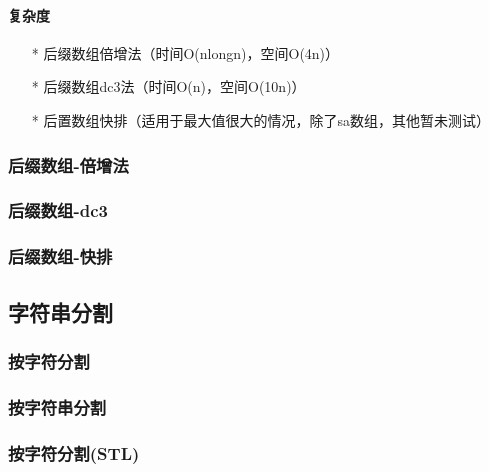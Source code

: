 \paragraph{复杂度}
\begin{itemize}
    \item[*] 后缀数组倍增法（时间O(nlongn)，空间O(4n)）
    \item[*] 后缀数组dc3法（时间O(n)，空间O(10n)）
    \item[*] 后置数组快排（适用于最大值很大的情况，除了sa数组，其他暂未测试）
\end{itemize}

\subsubsection{后缀数组-倍增法}


\subsubsection{后缀数组-dc3}


\subsubsection{后缀数组-快排}


\subsection{字符串分割}

\subsubsection{按字符分割}


\subsubsection{按字符串分割}


\subsubsection{按字符分割(STL)}

